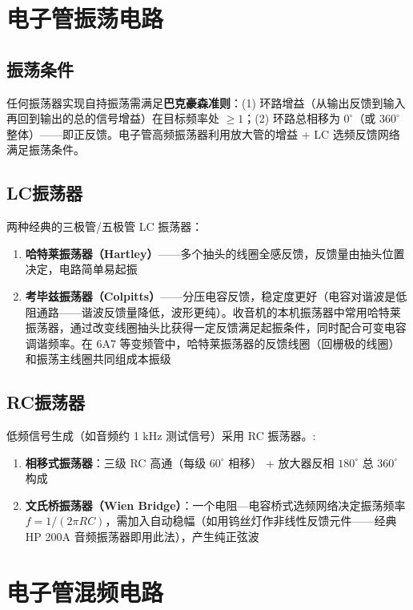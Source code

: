 \documentclass[12pt,UTF8]{ctexbook}
\begin{document}
\section{电子管振荡电路}
\label{sec:tube_oscillator}

\subsection{振荡条件}

任何振荡器实现自持振荡需满足\textbf{巴克豪森准则}：(1) 环路增益（从输出反馈到输入再回到输出的总的信号增益）在目标频率处 $\ge 1$；(2) 环路总相移为 $0^\circ$（或 $360^\circ$ 整体）——即正反馈。电子管高频振荡器利用放大管的增益 + LC 选频反馈网络满足振荡条件。

\subsection{LC振荡器}

两种经典的三极管/五极管 LC 振荡器：
\begin{enumerate}
\item \textbf{哈特莱振荡器（Hartley）}——多个抽头的线圈全感反馈，反馈量由抽头位置决定，电路简单易起振
\item \textbf{考毕兹振荡器（Colpitts）}——分压电容反馈，稳定度更好（电容对谐波是低阻通路——谐波反馈量降低，波形更纯）。收音机的本机振荡器中常用哈特莱振荡器，通过改变线圈抽头比获得一定反馈满足起振条件，同时配合可变电容调谐频率。在 6A7 等变频管中，哈特莱振荡器的反馈线圈（回栅极的线圈）和振荡主线圈共同组成本振级
\end{enumerate}

\subsection{RC振荡器}

低频信号生成（如音频约 1 kHz 测试信号）采用 RC 振荡器。:
\begin{enumerate}
\item \textbf{相移式振荡器}：三级 RC 高通（每级 $60^\circ$ 相移） + 放大器反相 $180^\circ$ 总 $360^\circ$ 构成
\item \textbf{文氏桥振荡器（Wien Bridge）}：一个电阻—电容桥式选频网络决定振荡频率 $f=1/(2\pi RC)$，需加入自动稳幅（如用钨丝灯作非线性反馈元件——经典 HP 200A 音频振荡器即用此法），产生纯正弦波
\end{enumerate}

\section{电子管混频电路}
\label{sec:tube_mixer}
\end{document}
